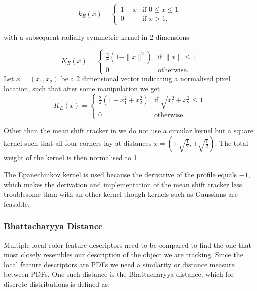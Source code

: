 \documentclass[a4paper,11pt]{article}
\begin{document}
\begin{equation}
\label{eq:epanechnikov_profile}
k_E(x) = \left\{ \begin{array}{cl}
  1-x & \textrm{if } 0 \leq x \leq 1\\
  0 & \textrm{if }  x > 1 ,\end{array}\right.
\end{equation}

with a subsequent radially symmetric kernel in 2 dimensions

\begin{equation}
\label{eq:epanechnikov_kernel1}
K_E(x) = \left\{ \begin{array}{cl}
  \frac{2}{\pi} (1-\|x\|^2) & \textrm{if } \|x\| \leq 1 \\
  0 & \textrm{otherwise.} \end{array}\right.
\end{equation}
Let $x = (x_1,x_2)$ be a 2 dimensional vector indicating a normalised pixel location, such that after some manipulation we get
\begin{equation}
\label{eq:epanechnikov_kernel2}
K_E(x) = \left\{ \begin{array}{cl}
  \frac{2}{\pi} (1-x_1^2 + x_2^2) & \textrm{if } \sqrt{x_1^2 + x_2^2} \leq 1 \\
  0 & \textrm{otherwise} \end{array}\right.
\end{equation}

Other than the mean shift tracker in \cite{mean_shift} we do not use a circular kernel but a square kernel such that all four corners lay at distances $x=(\pm \sqrt{\frac{1}{2}},\pm \sqrt{\frac{1}{2}})$. The total weight of the kernel is then normalised to 1.

The Epanechnikov kernel is used because the derivative of the profile equals $-1$, which makes the derivation and implementation of the mean shift tracker less troublesome than with an other kernel though kernels such as Gaussians are feasable.

\subsubsection{Bhattacharyya Distance}
Multiple local color feature descriptors need to be compared to find the one that most closely resembles our description of the object we are tracking. Since the local feature descriptors are PDFs we need a similarity or distance measure between PDFs. One such distance is the Bhattacharyya distance, which for discrete distributions is defined as:
\end{document}

